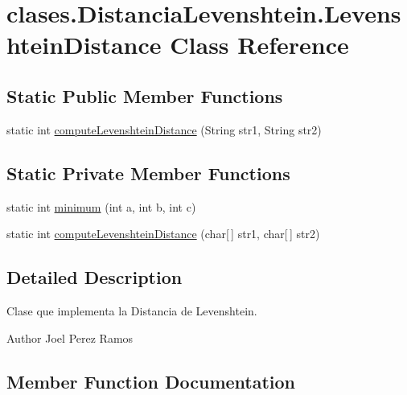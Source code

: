 \hypertarget{classclases_1_1_distancia_levenshtein_1_1_levenshtein_distance}{}\section{clases.\+Distancia\+Levenshtein.\+Levenshtein\+Distance Class Reference}
\label{classclases_1_1_distancia_levenshtein_1_1_levenshtein_distance}
\subsection*{Static Public Member Functions}
\begin{DoxyCompactItemize}
\item 
static int \hyperlink{classclases_1_1_distancia_levenshtein_1_1_levenshtein_distance_a32fafec4e825f1e645f3edb717515098}{compute\+Levenshtein\+Distance} (String str1, String str2)
\end{DoxyCompactItemize}
\subsection*{Static Private Member Functions}
\begin{DoxyCompactItemize}
\item 
static int \hyperlink{classclases_1_1_distancia_levenshtein_1_1_levenshtein_distance_a670f5fdf074856d2fa62eaedb9b36cad}{minimum} (int a, int b, int c)
\item 
static int \hyperlink{classclases_1_1_distancia_levenshtein_1_1_levenshtein_distance_a5391113c57cf7ac23d8d7ab745a7e979}{compute\+Levenshtein\+Distance} (char\mbox{[}$\,$\mbox{]} str1, char\mbox{[}$\,$\mbox{]} str2)
\end{DoxyCompactItemize}


\subsection{Detailed Description}
Clase que implementa la Distancia de Levenshtein. \begin{DoxyAuthor}{Author}
Joel Perez Ramos 
\end{DoxyAuthor}


\subsection{Member Function Documentation}
\hypertarget{classclases_1_1_distancia_levenshtein_1_1_levenshtein_distance_a32fafec4e825f1e645f3edb717515098}{}\label{classclases_1_1_distancia_levenshtein_1_1_levenshtein_distance_a32fafec4e825f1e645f3edb717515098} 
